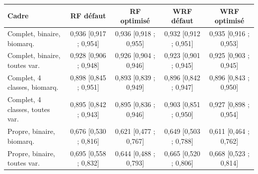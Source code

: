 \begin{tabular}{lcccc}
\toprule
Cadre & RF défaut & RF optimisé & WRF défaut & WRF optimisé \\
\midrule
Complet, binaire, biomarq. & 0,936 [0,917 ; 0,954] & 0,936 [0,918 ; 0,955] & 0,932 [0,912 ; 0,951] & 0,935 [0,916 ; 0,953] \\
Complet, binaire, toutes var. & 0,928 [0,906 ; 0,948] & 0,926 [0,904 ; 0,946] & 0,923 [0,901 ; 0,945] & 0,925 [0,903 ; 0,945] \\
Complet, 4 classes, biomarq. & 0,898 [0,845 ; 0,951] & 0,893 [0,839 ; 0,949] & 0,896 [0,842 ; 0,947] & 0,896 [0,843 ; 0,950] \\
Complet, 4 classes, toutes var. & 0,895 [0,842 ; 0,943] & 0,895 [0,836 ; 0,946] & 0,903 [0,851 ; 0,950] & 0,927 [0,898 ; 0,954] \\
Propre, binaire, biomarq. & 0,676 [0,530 ; 0,816] & 0,621 [0,477 ; 0,767] & 0,649 [0,503 ; 0,788] & 0,611 [0,464 ; 0,762] \\
Propre, binaire, toutes var. & 0,695 [0,558 ; 0,832] & 0,644 [0,488 ; 0,793] & 0,665 [0,520 ; 0,806] & 0,668 [0,523 ; 0,814] \\
\bottomrule
\end{tabular}
